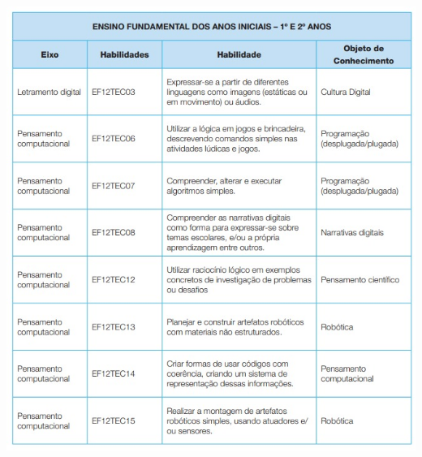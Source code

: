 \begin{center}
	\includegraphics[height=\textheight]{./IMG-GIT/ano-1-e-2.jpeg}
\end{center}

\pagebreak

%
\normalsize


